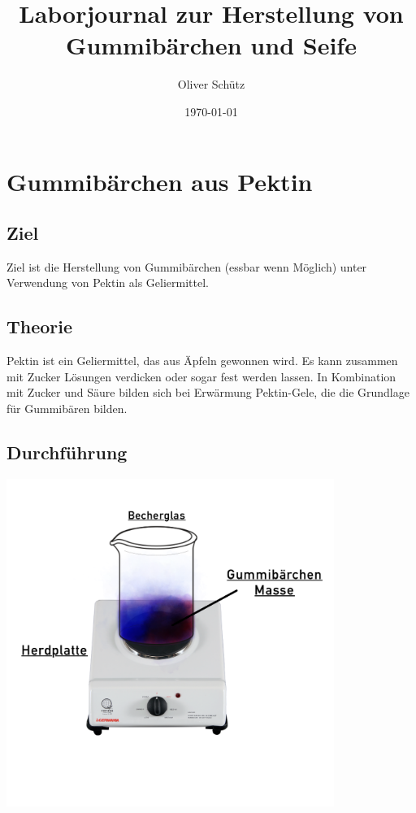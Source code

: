 \documentclass{article}
\title{Laborjournal zur Herstellung von Gummibärchen und Seife}
\author{Oliver Schütz}
\date{\today}
\begin{document}
    \maketitle

    \section{Gummibärchen aus Pektin}

    \subsection{Ziel}
    Ziel ist die Herstellung von Gummibärchen (essbar wenn Möglich) unter Verwendung von Pektin als Geliermittel.

    \subsection{Theorie}
    Pektin ist ein Geliermittel, das aus Äpfeln gewonnen wird.
    Es kann zusammen mit Zucker Lösungen verdicken oder sogar fest werden lassen.
    In Kombination mit Zucker und Säure bilden sich bei Erwärmung Pektin-Gele, die die Grundlage für Gummibären bilden.


    \subsection{Durchführung}

    \includegraphics[width=0.8\textwidth]{Gummi.png} \\
\end{document}
